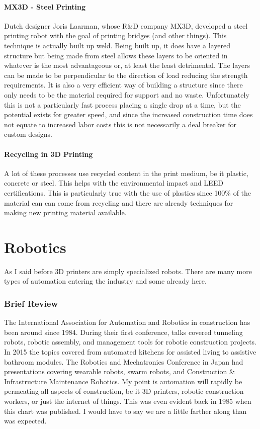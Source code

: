 \documentclass[12pt]{article}
\begin{document}
\paragraph{MX3D - Steel Printing}
Dutch designer Joris Laarman, whose R\&D company MX3D, developed a steel printing robot with the goal of printing bridges (and other things).  This technique is actually built up weld.  Being built up, it does have a layered structure but being made from steel allows these layers to be oriented in whatever is the most advantageous or, at least the least detrimental.  The layers can be made to be perpendicular to the direction of load reducing the strength requirements.  It is also a very efficient way of building a structure since there only needs to be the material required for support and no waste.  Unfortunately this is not a particularly fast process placing a single drop at a time, but the potential exists for greater speed, and since the increased construction time does not equate to increased labor costs this is not necessarily a deal breaker for custom designs.
\paragraph{Recycling in 3D Printing}
A lot of these processes use recycled content in the print medium, be it plastic, concrete or steel.  This helps with the environmental impact and LEED certifications.  This is particularly true with the use of plastics since 100\% of the material can can come from recycling and there are already techniques for making new printing material available.
\section{Robotics}
As I said before 3D printers are simply specialized robots.  There are many more types of automation entering the industry and some already here.  
\subsubsection{Brief Review}
The International Association for Automation and Robotics in construction has been around since 1984.  During their first conference, talks covered tunneling robots, robotic assembly, and management tools for robotic construction projects.  In 2015 the topics covered from automated kitchens for assisted living to assistive bathroom modules.  The Robotics and Mechatronics Conference in Japan had presentations covering wearable robots, swarm robots, and Construction \& Infrastructure Maintenance Robotics.  My point is automation will rapidly be permeating all aspects of construction, be it 3D printers, robotic construction workers, or just the internet of things.  This was even evident back in 1985 when this chart was published.  I would have to say we are a little farther along than was expected.
\end{document}

